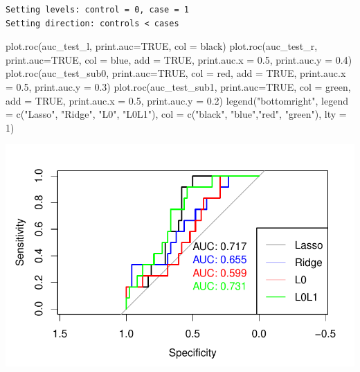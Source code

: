 \documentclass[
  letterpaper,
  DIV=11,
  numbers=noendperiod]{scrartcl}
\newenvironment{Shaded}{\begin{snugshade}}{\end{snugshade}}
\newcommand{\AttributeTok}[1]{\textcolor[rgb]{0.40,0.45,0.13}{#1}}
\newcommand{\ConstantTok}[1]{\textcolor[rgb]{0.56,0.35,0.01}{#1}}
\newcommand{\DecValTok}[1]{\textcolor[rgb]{0.68,0.00,0.00}{#1}}
\newcommand{\FloatTok}[1]{\textcolor[rgb]{0.68,0.00,0.00}{#1}}
\newcommand{\FunctionTok}[1]{\textcolor[rgb]{0.28,0.35,0.67}{#1}}
\newcommand{\NormalTok}[1]{\textcolor[rgb]{0.00,0.23,0.31}{#1}}
\newcommand{\StringTok}[1]{\textcolor[rgb]{0.13,0.47,0.30}{#1}}
\begin{document}
\begin{verbatim}
Setting levels: control = 0, case = 1
Setting direction: controls < cases
\end{verbatim}

\begin{Shaded}
\begin{Highlighting}[]
\FunctionTok{plot.roc}\NormalTok{(auc\_test\_l, }\AttributeTok{print.auc=}\ConstantTok{TRUE}\NormalTok{, }\AttributeTok{col =} \StringTok{\textquotesingle{}black\textquotesingle{}}\NormalTok{)}
\FunctionTok{plot.roc}\NormalTok{(auc\_test\_r, }\AttributeTok{print.auc=}\ConstantTok{TRUE}\NormalTok{, }\AttributeTok{col =} \StringTok{\textquotesingle{}blue\textquotesingle{}}\NormalTok{, }\AttributeTok{add =} \ConstantTok{TRUE}\NormalTok{, }\AttributeTok{print.auc.x =} \FloatTok{0.5}\NormalTok{, }\AttributeTok{print.auc.y =} \FloatTok{0.4}\NormalTok{)}
\FunctionTok{plot.roc}\NormalTok{(auc\_test\_sub0, }\AttributeTok{print.auc=}\ConstantTok{TRUE}\NormalTok{, }\AttributeTok{col =} \StringTok{\textquotesingle{}red\textquotesingle{}}\NormalTok{, }\AttributeTok{add =} \ConstantTok{TRUE}\NormalTok{, }\AttributeTok{print.auc.x =} \FloatTok{0.5}\NormalTok{, }\AttributeTok{print.auc.y =} \FloatTok{0.3}\NormalTok{)}
\FunctionTok{plot.roc}\NormalTok{(auc\_test\_sub1, }\AttributeTok{print.auc=}\ConstantTok{TRUE}\NormalTok{, }\AttributeTok{col =} \StringTok{\textquotesingle{}green\textquotesingle{}}\NormalTok{, }\AttributeTok{add =} \ConstantTok{TRUE}\NormalTok{, }\AttributeTok{print.auc.x =} \FloatTok{0.5}\NormalTok{, }\AttributeTok{print.auc.y =} \FloatTok{0.2}\NormalTok{)}
\FunctionTok{legend}\NormalTok{(}\StringTok{"bottomright"}\NormalTok{, }\AttributeTok{legend =} \FunctionTok{c}\NormalTok{(}\StringTok{"Lasso"}\NormalTok{, }\StringTok{"Ridge"}\NormalTok{, }\StringTok{"L0"}\NormalTok{, }\StringTok{"L0L1"}\NormalTok{), }\AttributeTok{col =} \FunctionTok{c}\NormalTok{(}\StringTok{"black"}\NormalTok{, }\StringTok{"blue"}\NormalTok{,}\StringTok{"red"}\NormalTok{, }\StringTok{"green"}\NormalTok{), }\AttributeTok{lty =} \DecValTok{1}\NormalTok{)}
\end{Highlighting}
\end{Shaded}

\includegraphics{Untitled_files/figure-pdf/unnamed-chunk-8-1.pdf}
\end{document}
